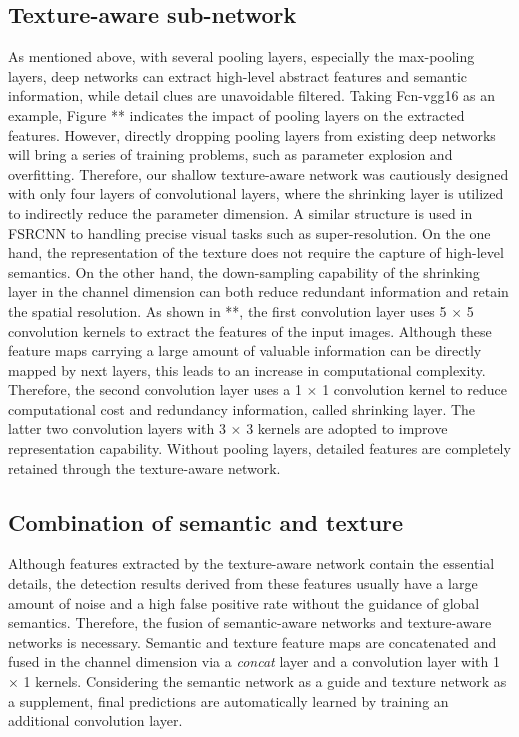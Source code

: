 \documentclass{article}
\begin{document}
\subsection{Texture-aware sub-network}
\label{Texture-aware sub-network}
As mentioned above, with several pooling layers, especially the max-pooling layers, deep networks can extract high-level abstract features and semantic information, while detail clues are unavoidable filtered. Taking Fcn-vgg16 as an example, Figure ** indicates the impact of pooling layers on the extracted features. However, directly dropping pooling layers from existing deep networks will bring a series of training problems, such as parameter explosion and overfitting. Therefore, our shallow texture-aware network was cautiously designed with only four layers of convolutional layers, where the shrinking layer is utilized to indirectly reduce the parameter dimension. A similar structure is used in FSRCNN \cite{dong2016accelerating} to handling precise visual tasks such as super-resolution. On the one hand, the representation of the texture does not require the capture of high-level semantics. On the other hand, the down-sampling capability of the shrinking layer in the channel dimension can both reduce redundant information and retain the spatial resolution. As shown in **, the first convolution layer uses 5 $\times$ 5 convolution kernels to extract the features of the input images. Although these feature maps carrying a large amount of valuable information can be directly mapped by next layers, this leads to an increase in computational complexity. Therefore, the second convolution layer uses a 1 $\times$ 1 convolution kernel to reduce computational cost and redundancy information, called shrinking layer. The latter two convolution layers with 3 $\times$ 3 kernels are adopted to improve representation capability. Without pooling layers, detailed features are completely retained through the texture-aware network.




\subsection{Combination of semantic and texture}
\label{Combination}

Although features extracted by the texture-aware network contain the essential details, the detection results derived from these features usually have a large amount of noise and a high false positive rate without the guidance of global semantics. Therefore, the fusion of semantic-aware networks and texture-aware networks is necessary. Semantic and texture feature maps are concatenated and fused in the channel dimension via a {\it concat} layer and a convolution layer with 1 $\times$ 1 kernels. Considering the semantic network as a guide and texture network as a supplement, final predictions are automatically learned by training an additional convolution layer.
\end{document}
